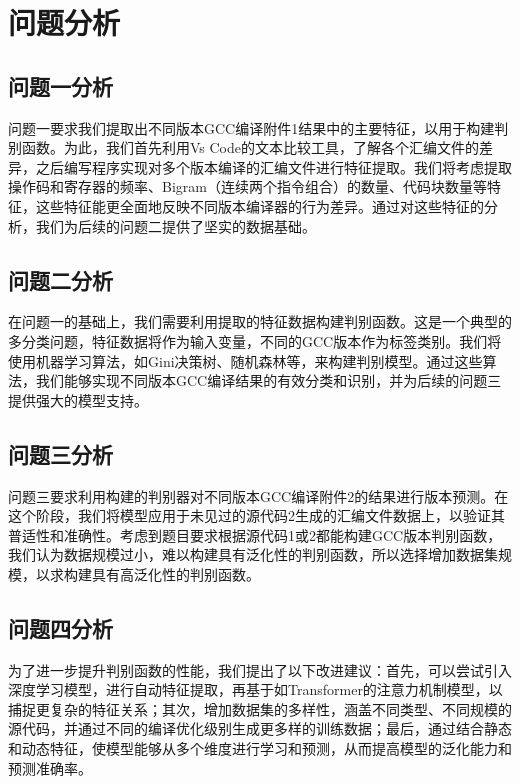 \section{问题分析}
\subsection{问题一分析}
问题一要求我们提取出不同版本GCC编译附件1结果中的主要特征，以用于构建判别函数。为此，我们首先利用Vs Code的文本比较工具，了解各个汇编文件的差异，之后编写程序实现对多个版本编译的汇编文件进行特征提取。我们将考虑提取操作码和寄存器的频率、Bigram（连续两个指令组合）的数量、代码块数量等特征，这些特征能更全面地反映不同版本编译器的行为差异。通过对这些特征的分析，我们为后续的问题二提供了坚实的数据基础。
\vspace*{1cm}
\subsection{问题二分析}
在问题一的基础上，我们需要利用提取的特征数据构建判别函数。这是一个典型的多分类问题，特征数据将作为输入变量，不同的GCC版本作为标签类别。我们将使用机器学习算法，如Gini决策树、随机森林等，来构建判别模型。通过这些算法，我们能够实现不同版本GCC编译结果的有效分类和识别，并为后续的问题三提供强大的模型支持。
\vspace*{1cm}
\subsection{问题三分析}
问题三要求利用构建的判别器对不同版本GCC编译附件2的结果进行版本预测。在这个阶段，我们将模型应用于未见过的源代码2生成的汇编文件数据上，以验证其普适性和准确性。考虑到题目要求根据源代码1或2都能构建GCC版本判别函数，我们认为数据规模过小，难以构建具有泛化性的判别函数，所以选择增加数据集规模，以求构建具有高泛化性的判别函数。
\vspace*{1cm}
\subsection{问题四分析}
为了进一步提升判别函数的性能，我们提出了以下改进建议：首先，可以尝试引入深度学习模型，进行自动特征提取，再基于如Transformer的注意力机制模型，以捕捉更复杂的特征关系；其次，增加数据集的多样性，涵盖不同类型、不同规模的源代码，并通过不同的编译优化级别生成更多样的训练数据；最后，通过结合静态和动态特征，使模型能够从多个维度进行学习和预测，从而提高模型的泛化能力和预测准确率。
\vspace*{1cm}